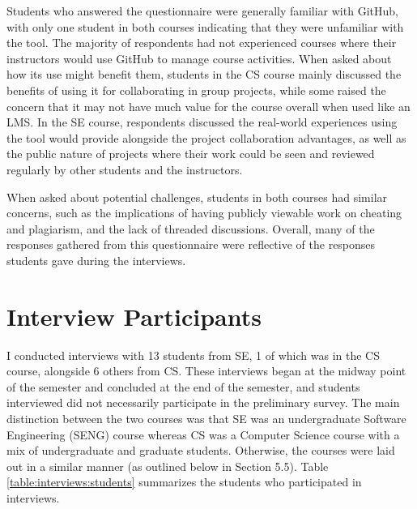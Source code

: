 Students who answered the questionnaire were generally familiar with GitHub, with only one student in both courses indicating that they were unfamiliar with the tool. The majority of respondents had not experienced courses where their instructors would use GitHub to manage course activities. When asked about how its use might benefit them, students in the CS course mainly discussed the benefits of using it for collaborating in group projects, while some raised the concern that it may not have much value for the course overall when used like an LMS. In the SE course, respondents discussed the real-world experiences using the tool would provide alongside the project collaboration advantages, as well as the public nature of projects where their work could be seen and reviewed regularly by other students and the instructors.

When asked about potential challenges, students in both courses had similar concerns, such as the implications of having publicly viewable work on cheating and plagiarism, and the lack of threaded discussions. Overall, many of the responses gathered from this questionnaire were reflective of the responses students gave during the interviews.

\section{Interview Participants}
I conducted interviews with 13 students from SE, 1 of which was in the CS course, alongside 6 others from CS. These interviews began at the midway point of the semester and concluded at the end of the semester, and students interviewed did not necessarily participate in the preliminary survey. The main distinction between the two courses was that SE was an undergraduate Software Engineering (SENG) course whereas CS was a Computer Science course with a mix of undergraduate and graduate students. Otherwise, the courses were laid out in a similar manner (as outlined below in Section 5.5). Table \ref{table:interviews:students} summarizes the students who participated in interviews.

